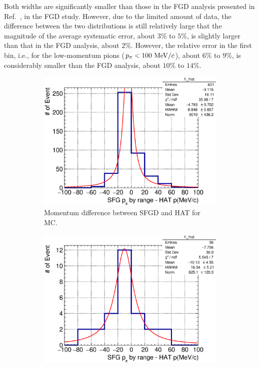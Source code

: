           Both widths are significantly smaller than those in the FGD analysis presented in Ref.~\cite{Jenkins:2022ljx}, in the FGD study.
          However, due to the limited amount of data, the difference between the two distributions is still relatively large that the magnitude of the average systematic error, about $3\%$ to $5\%$, is slightly larger than that in the FGD analysis, about $2\%$. 
          However, the relative error in the first bin, i.e., for the low-momentum pions ($p_{\pi}<100~\textrm{MeV}/c$), about $6\%$ to $9\%$, is considerably smaller than the FGD analysis, about $10\%$ to $14\%$.
          \begin{figure}[h]
          \centering
          \begin{subfigure}[h]{\dbfigwid\textwidth}
          \centering
          \includegraphics[width=\textwidth]{figures/sel/sspi_TOP_pi_mombr_hatp_difhist_al6_mc.eps}
          \caption{Momentum difference between SFGD and HAT for MC.}
          \label{subfig:sfgp-hatp-dif-mc}
          \end{subfigure}
          \hfill
          \begin{subfigure}[h]{\dbfigwid\textwidth}
          \centering
          \includegraphics[width=\textwidth]{figures/sel/sspi_TOP_pi_mombr_hatp_difhist_al4_CombHAT_data.eps}

\end{subfigure}
\end{figure}
